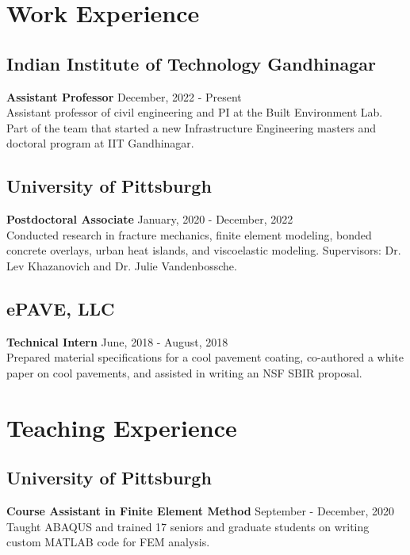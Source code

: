 \documentclass[12pt]{article}
\begin{document}
\bigskip
\section*{Work Experience}
\hfill
\subsection*{Indian Institute of Technology Gandhinagar}
\textbf{Assistant Professor} \hfill December, 2022 - Present \\
Assistant professor of civil engineering and PI at the Built Environment Lab. Part of the team that started a new Infrastructure Engineering masters and doctoral program at IIT Gandhinagar. \\

\subsection*{University of Pittsburgh}
\textbf{Postdoctoral Associate} \hfill January, 2020 - December, 2022 \\
Conducted research in fracture mechanics, finite element modeling, bonded concrete overlays, urban heat islands, and viscoelastic modeling. Supervisors: Dr. Lev Khazanovich and Dr. Julie Vandenbossche.\\

\subsection*{ePAVE, LLC}
\textbf{Technical Intern} \hfill June, 2018 - August, 2018 \\
Prepared material specifications for a cool pavement coating, co-authored a white paper on cool pavements, and assisted in writing an NSF SBIR proposal. 

\bigskip
\section*{Teaching Experience}
\hfill
\subsection*{University of Pittsburgh}
\textbf{Course Assistant in Finite Element Method} \hfill September - December, 2020 \\
Taught ABAQUS and trained 17 seniors and graduate students on writing custom MATLAB code for FEM analysis. \\
\end{document}
